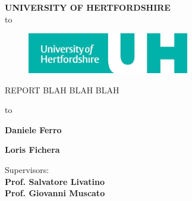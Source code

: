 \begin{titlepage}
  \begin{center}
    \textbf{\uppercase{University of HertfordShire}}\\
    \hbox to \textwidth{\hrulefill}
    
    \vspace{1truecm}
    
    \begin{figure}[!h]
      \begin{center}
        \includegraphics[width=200pt]{img/uni_logo}  %
      \end{center}
    \end{figure}
              
    \uppercase{ {\sc Report blah blah blah} }
              
    \vspace{1truecm}
    
    \hbox to \textwidth{\hrulefill}
    
    \vspace{1truecm}
    
    \begin{flushright}
      \textbf{Daniele Ferro} \\                
      \vspace{0.5truecm}
      
      \textbf{Loris Fichera} \\
      \vspace{1truecm}
                
      Supervisors:\\
      \textbf{Prof. Salvatore Livatino }\\
      \textbf{Prof. Giovanni Muscato}
                
    \end{flushright}
    
    \vspace{1truecm}
    
  \end{center}
  
\end{titlepage}

\setlength{\baselineskip}{1.3\baselineskip} %

\tableofcontents

\newpage

